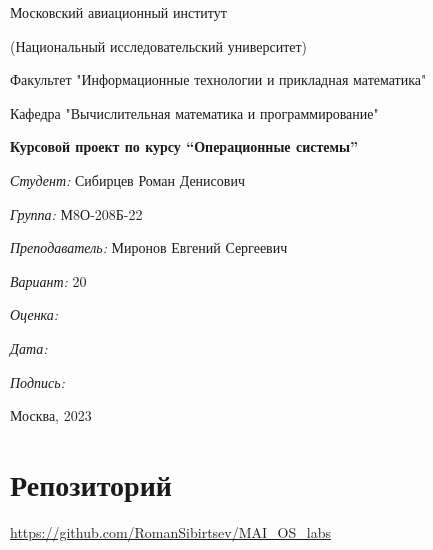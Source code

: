 \documentclass[a4paper, 12pt]{article}
\begin{document}
\thispagestyle{empty}	
\begin{center}
	Московский авиационный институт
	
	(Национальный исследовательский университет)
	
	Факультет "Информационные технологии и прикладная математика"
	
	Кафедра "Вычислительная математика и программирование"
	
\end{center}
\vspace{40ex}
\begin{center}
	\textbf{\large{Курсовой проект по курсу \linebreak \textquotedblleft Операционные системы\textquotedblright}}
\end{center}
\vspace{35ex}
\begin{flushright}
	\textit{Студент: } Сибирцев Роман Денисович
	
	\vspace{2ex}
	\textit{Группа: } М8О-208Б-22
	
	\vspace{2ex}
	\textit{Преподаватель: } Миронов Евгений Сергеевич
	
	\vspace{2ex}
	\textit{Вариант: } 20
	
	\vspace{2ex}
	\textit{Оценка: } \underline{\quad\quad\quad\quad\quad\quad}
	
	 \vspace{2ex}
	\textit{Дата: } \underline{\quad\quad\quad\quad\quad\quad}
	
	\vspace{2ex}
	\textit{Подпись: } \underline{\quad\quad\quad\quad\quad\quad}
	
\end{flushright}

\vspace{5ex}

\begin{vfill}
	\begin{center}
		Москва, 2023
	\end{center}	
\end{vfill}
\newpage

\begingroup
\color{black}
\tableofcontents\newpage
\endgroup

\section{Репозиторий}
\href{https://github.com/RomanSibirtsev/MAI_OS_labs}{https://github.com/RomanSibirtsev/MAI\_OS\_labs}
\end{document}
